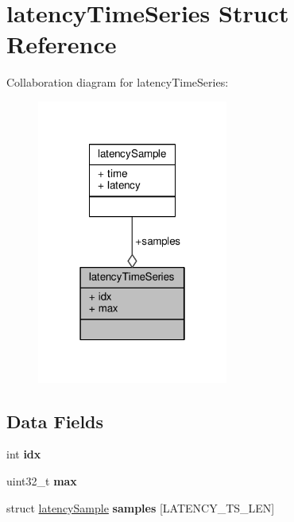 \hypertarget{structlatencyTimeSeries}{}\section{latency\+Time\+Series Struct Reference}
\label{structlatencyTimeSeries}


Collaboration diagram for latency\+Time\+Series\+:\nopagebreak
\begin{figure}[H]
\begin{center}
\leavevmode
\includegraphics[width=178pt]{structlatencyTimeSeries__coll__graph}
\end{center}
\end{figure}
\subsection*{Data Fields}
\begin{DoxyCompactItemize}
\item 
\mbox{\label{structlatencyTimeSeries_a4e4ff86c4d49c4ef123dd4887fb367aa}} 
int {\bfseries idx}
\item 
\mbox{\label{structlatencyTimeSeries_a8ad82b8920ab3169a8fdb69d10502bb9}} 
uint32\+\_\+t {\bfseries max}
\item 
\mbox{\label{structlatencyTimeSeries_aa9987016e8c94d967f55575f77e337eb}} 
struct \hyperlink{structlatencySample}{latency\+Sample} {\bfseries samples} \mbox{[}L\+A\+T\+E\+N\+C\+Y\+\_\+\+T\+S\+\_\+\+L\+EN\mbox{]}
\end{DoxyCompactItemize}


